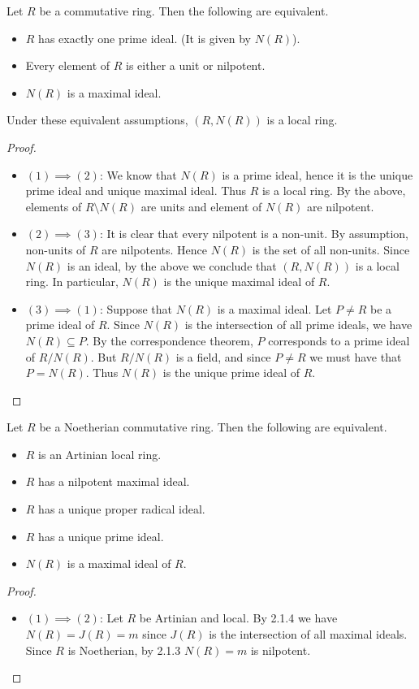 \documentclass[a4paper]{article}
\begin{document}
\begin{prp}{}{} Let $R$ be a commutative ring. Then the following are equivalent. 
\begin{itemize}
\item $R$ has exactly one prime ideal. (It is given by $N(R)$).
\item Every element of $R$ is either a unit or nilpotent. 
\item $N(R)$ is a maximal ideal. 
\end{itemize}
Under these equivalent assumptions, $(R,N(R))$ is a local ring. \tcbline
\begin{proof}~\\
\begin{itemize}
\item $(1)\implies(2)$: We know that $N(R)$ is a prime ideal, hence it is the unique prime ideal and unique maximal ideal. Thus $R$ is a local ring. By the above, elements of $R\setminus N(R)$ are units and element of $N(R)$ are nilpotent. 
\item $(2)\implies(3)$: It is clear that every nilpotent is a non-unit. By assumption, non-units of $R$ are nilpotents. Hence $N(R)$ is the set of all non-units. Since $N(R)$ is an ideal, by the above we conclude that $(R,N(R))$ is a local ring. In particular, $N(R)$ is the unique maximal ideal of $R$. 
\item $(3)\implies(1)$: Suppose that $N(R)$ is a maximal ideal. Let $P\neq R$ be a prime ideal of $R$. Since $N(R)$ is the intersection of all prime ideals, we have $N(R)\subseteq P$. By the correspondence theorem, $P$ corresponds to a prime ideal of $R/N(R)$. But $R/N(R)$ is a field, and since $P\neq R$ we must have that $P=N(R)$. Thus $N(R)$ is the unique prime ideal of $R$. 
\end{itemize}
\end{proof}
\end{prp}

\begin{prp}{}{} Let $R$ be a Noetherian commutative ring. Then the following are equivalent. 
\begin{itemize}
\item $R$ is an Artinian local ring. 
\item $R$ has a nilpotent maximal ideal. 
\item $R$ has a unique proper radical ideal. 
\item $R$ has a unique prime ideal. 
\item $N(R)$ is a maximal ideal of $R$. 
\end{itemize} \tcbline
\begin{proof}~\\
\begin{itemize}
\item $(1)\implies(2)$: Let $R$ be Artinian and local. By 2.1.4 we have $N(R)=J(R)=m$ since $J(R)$ is the intersection of all maximal ideals. Since $R$ is Noetherian, by 2.1.3 $N(R)=m$ is nilpotent. 
\end{itemize}
\end{proof}
\end{prp}
\end{document}
